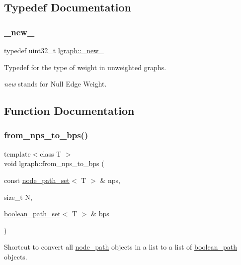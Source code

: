 \subsection{Typedef Documentation}
\mbox{\label{namespacelgraph_a2836f966c1c36b43da337d8907728ec0}} 
\subsubsection{\texorpdfstring{\+\_\+new\+\_\+}{\_new\_}}
{\footnotesize\ttfamily typedef uint32\+\_\+t \hyperlink{namespacelgraph_a2836f966c1c36b43da337d8907728ec0}{lgraph\+::\+\_\+new\+\_\+}}



Typedef for the type of weight in unweighted graphs. 

{\itshape new} stands for Null Edge Weight. 

\subsection{Function Documentation}
\mbox{\label{namespacelgraph_a22faf23dc44c909b5727c26625637447}} 
\subsubsection{\texorpdfstring{from\+\_\+nps\+\_\+to\+\_\+bps()}{from\_nps\_to\_bps()}}
{\footnotesize\ttfamily template$<$class T $>$ \\
void lgraph\+::from\+\_\+nps\+\_\+to\+\_\+bps (\begin{DoxyParamCaption}\item[{const \hyperlink{namespacelgraph_a0570ce57129123d5816913d287f6cc73}{node\+\_\+path\+\_\+set}$<$ T $>$ \&}]{nps,  }\item[{size\+\_\+t}]{N,  }\item[{\hyperlink{namespacelgraph_afad432931ba600ab1628d5c9595986c5}{boolean\+\_\+path\+\_\+set}$<$ T $>$ \&}]{bps }\end{DoxyParamCaption})}



Shortcut to convert all \hyperlink{classlgraph_1_1node__path}{node\+\_\+path} objects in a list to a list of \hyperlink{classlgraph_1_1boolean__path}{boolean\+\_\+path} objects. 


